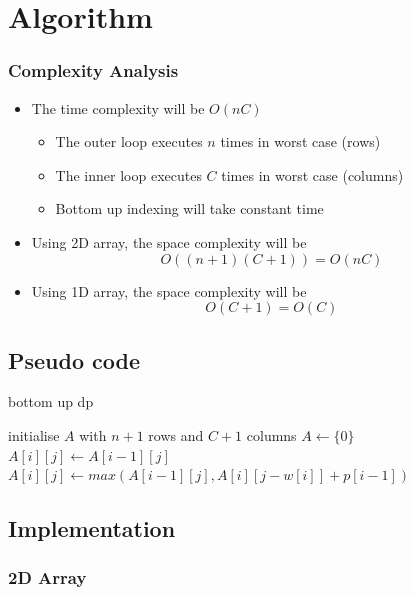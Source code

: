 \documentclass{beamer}
\begin{document}
\section{Algorithm}
\begin{frame}
	\frametitle{Complexity Analysis}
	\begin{itemize}
		\item The time complexity will be \( O(nC) \) 		
			\begin{itemize}
				\item The outer loop executes \( n \) times in worst case (rows)
				\item The inner loop executes \( C \) times in worst case (columns)
				\item Bottom up indexing will take constant time 
			\end{itemize}
		\item Using 2D array, the space complexity will be
			\[
				O((n+1)(C+1)) = O(nC)
			\]
		\item Using 1D array, the space complexity will be
			\[
				O(C+1) = O(C)
			\]
	\end{itemize}
\end{frame}

\subsection{Pseudo code}
\begin{frame}
		\begin{algorithm}[H]
		\caption{bottom up dp}
		\begin{algorithmic}[1]
			\State initialise \( A \) with \( n+1 \) rows and \( C+1 \) columns
			\State \( A \gets \{0\} \) 
			\State $A[i][j] \gets A[i-1][j]$ 
			\Else
			\State \( A[i][j] \gets max(A[i-1][j], A[i][j-w[i]]+p[i-1]) \) 
			\EndIf
			\EndFor
			\EndFor
			\EndFunction
		\end{algorithmic}
	\end{algorithm}	
\end{frame}

\subsection{Implementation}
\begin{frame}
	\frametitle{2D Array}
  
\end{frame}
\end{document}
